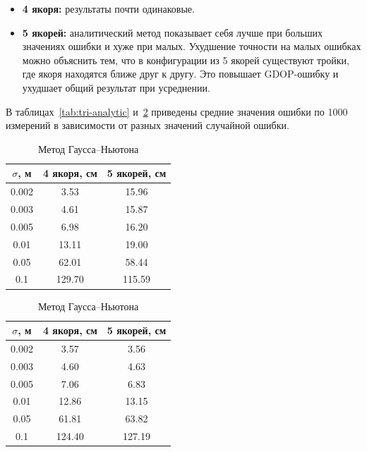 \begin{itemize}
  \item \textbf{4 якоря:} результаты почти одинаковые.
  \item \textbf{5 якорей:} аналитический метод показывает себя лучше при больших значениях ошибки и хуже при малых.
Ухудшение точности на малых ошибках можно объяснить тем, что в конфигурации из 5 якорей существуют тройки,
где якоря находятся ближе друг к другу. Это повышает GDOP-ошибку и ухудшает общий результат при усреднении.
\end{itemize}

В таблицах~\ref{tab:tri-analytic} и~\ref{tab:tri-gn} приведены средние значения ошибки по 1000 измерений в зависимости от разных значений случайной ошибки.
\begin{table}[h!]
  \centering
  \begin{minipage}{0.48\textwidth}
    \centering
    \caption{Аналитический метод}
    \label{tab:tri-analytic}
    \begin{tabular}{|c|c|c|}
        \hline
        $\sigma$, м & 4 якоря, см & 5 якорей, см \\
        \hline
        0.002 & 3.53 & 15.96 \\
        \hline
        0.003 & 4.61 & 15.87 \\
        \hline
        0.005 & 6.98 & 16.20 \\
        \hline
        0.01 & 13.11 & 19.00 \\
        \hline
        0.05 & 62.01 & 58.44 \\
        \hline
        0.1 & 129.70 & 115.59 \\
        \hline
    \end{tabular}
  \end{minipage}%
  \hspace{0.04\textwidth}%
  \begin{minipage}{0.48\textwidth}
    \centering
    \caption{Метод Гаусса--Ньютона}
    \label{tab:tri-gn}
    \begin{tabular}{|c|c|c|}
        \hline
        $\sigma$, м & 4 якоря, см & 5 якорей, см \\
        \hline
        0.002 & 3.57 & 3.56 \\
        \hline
        0.003 & 4.60 & 4.63 \\
        \hline
        0.005 & 7.06 & 6.83 \\
        \hline
        0.01 & 12.86 & 13.15 \\
        \hline
        0.05 & 61.81 & 63.82 \\
        \hline
        0.1 & 124.40 & 127.19 \\
        \hline
    \end{tabular}
  \end{minipage}
\end{table}

